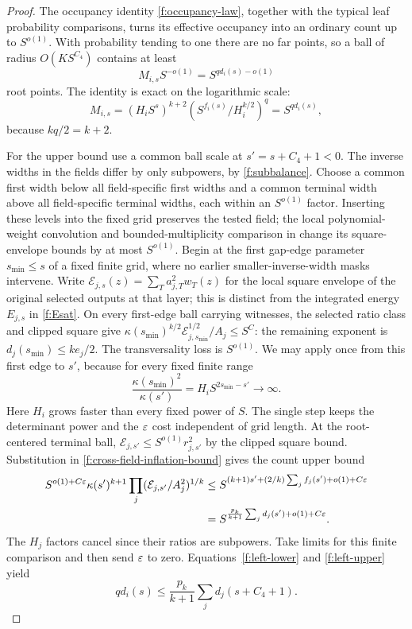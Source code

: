 \begin{proof}
The occupancy identity \eqref{f:occupancy-law}, together with the
typical leaf probability comparisons, turns its effective
occupancy into an ordinary count up to $S^{o(1)}$. With probability
tending to one there are no far points, so a ball of radius
$O(KS^{C_4})$ contains at least
\begin{equation}\label{f:left-lower}
 M_{i,s}S^{-o(1)}=S^{qd_i(s)-o(1)}
\end{equation}
root points. The identity is exact on the logarithmic scale:
\[
 M_{i,s}=(H_iS^s)^{k+2}
             (S^{f_i(s)}/H_i^{k/2})^q=S^{qd_i(s)},
\]
because $kq/2=k+2$.

For the upper bound use a common ball scale at
$s'=s+C_4+1<0$. The inverse widths in the fields differ by only
subpowers, by \eqref{f:subbalance}. Choose a common first width below
all field-specific first widths and a common terminal width above all
field-specific terminal widths, each within an $S^{o(1)}$ factor.
Inserting these levels into the fixed grid preserves the tested field;
the local polynomial-weight convolution and bounded-multiplicity
comparison in  change its square-envelope bounds by
at most $S^{o(1)}$. Begin at
the first gap-edge parameter $s_{\min}\le s$ of a fixed finite
grid, where no earlier smaller-inverse-width masks intervene.
Write $\mathcal E_{j,s}(z)=\sum_Ta_{j,T}^2w_T(z)$ for the local
square envelope of the original selected outputs at that layer;
this is distinct from the integrated energy $E_{j,s}$ in
\eqref{f:Esat}. On every first-edge ball carrying witnesses, the
selected ratio class and clipped square give
$\kappa(s_{\min})^{k/2}\mathcal E_{j,s_{\min}}^{1/2}/A_j\le S^C$:
the remaining exponent is $d_j(s_{\min})\le ke_j/2$.
The transversality loss is $S^{o(1)}$. We may apply
 once from this first edge to $s'$,
because for every fixed finite range
\[
 \frac{\kappa(s_{\min})^2}{\kappa(s')}
 =H_iS^{2s_{\min}-s'}\longrightarrow\infty.
\]
Here $H_i$ grows faster than every fixed power of $S$. The single
step keeps the determinant power and the $\varepsilon$ cost independent
of grid length. At the root-centered terminal ball,
$\mathcal E_{j,s'}\le S^{o(1)}r_{j,s'}^2$ by the clipped square
bound. Substitution in \eqref{f:cross-field-inflation-bound} gives the count
upper bound
\begin{align}
 S^{o(1)+C\varepsilon}\kappa(s')^{k+1}
           \prod_j(\mathcal E_{j,s'}/A_j^2)^{1/k}
 &\le S^{(k+1)s'+(2/k)\sum_jf_j(s')+o(1)+C\varepsilon}\notag\\
 &=S^{\frac{p_k}{k+1}\sum_jd_j(s')+o(1)+C\varepsilon}.
                                                        \label{f:left-upper}
\end{align}
The $H_j$ factors cancel since their ratios are subpowers.
Take limits for this finite comparison and then send $\varepsilon$ to
zero. Equations~\eqref{f:left-lower} and \eqref{f:left-upper} yield
\[
 qd_i(s)\le\frac{p_k}{k+1}\sum_jd_j(s+C_4+1).
\]


\end{proof}
